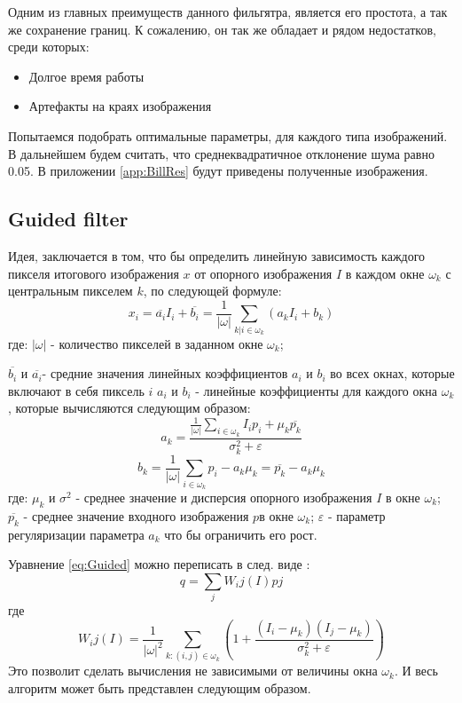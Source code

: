 Одним из главных преимуществ данного фильгятра, является его простота, а так же сохранение границ. К сожалению, он так же обладает и рядом недостатков, среди которых:

\begin{itemize}
	\item Долгое время работы
	\item Артефакты на краях изображения
\end{itemize}

Попытаемся подобрать оптимальные параметры, для каждого типа изображений. В дальнейшем будем считать, что среднеквадратичное отклонение шума равно 0.05.
В приложении \ref{app:BillRes} будут приведены полученные изображения.


\subsection{Guided filter}
Идея, заключается в том, что бы определить линейную зависимость каждого пикселя итогового изображения $x$ от опорного изображения $I$ в каждом окне $\omega_k$ с центральным пикселем $k$, по следующей формуле:
\begin{equation}\label{eq:Guided}
	x_i = \overline{a_i}I_i + \overline{b_i}=\frac{1}{|\omega|}\sum_{k|i\in\omega_k}(a_kI_i+b_k)
\end{equation} 
где: $|\omega|$ - количество пикселей в заданном окне $\omega_k$;

$\overline{b_i}$ и $\overline{a_i}$- средние значения линейных коэффициентов $a_i$ и $b_i$ во всех окнах, которые включают в себя пиксель $i$
$a_i$ и $b_i$ - линейные коэффициенты для каждого окна $\omega_k$, которые вычисляются следующим образом:
\begin{equation}
a_k=\frac{\frac{1}{|\omega|}\sum_{i\in\omega_k}I_ip_i+\mu_k\overline{p_k}}{\sigma_k^2+\varepsilon}
\end{equation}
\begin{equation}
b_k=\frac{1}{|\omega|}\sum_{i\in\omega_k}p_i-a_k\mu_k=\overline{p_k} - a_k\mu_k
\end{equation}
где: $\mu_k$ и $\sigma^2$ - среднее значение и дисперсия опорного изображения $I$ в окне $\omega_k$;
$\overline{p_k}$ - среднее значение входного изображения $p$в окне $\omega_k$;
$\varepsilon$ - параметр регуляризации параметра $a_k$ что бы ограничить его рост.

Уравнение \ref{eq:Guided}  можно переписать в след. виде \cite{He}:
\begin{equation}
q = \sum_j W_ij(I)pj
\end{equation}
где
\begin{equation}
W_ij(I)=\frac{1}{|\omega|^2} \sum_{k:(i,j)\in \omega_k}(1 + \frac{(I_i-\mu_k)(I_j-\mu_k)}{\sigma_k^2 + \varepsilon})
\end{equation}
Это позволит сделать вычисления не зависимыми от величины окна $\omega_k$. И весь алгоритм может быть представлен следующим образом.


